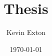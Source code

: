 \documentclass[11pt, a4paper, draft]{report}
\title{Thesis}
\author{Kevin Exton}
\date{\today}
\begin{document}
\maketitle
\renewcommand{\abstractname}{Executive Summary}
\begin{abstract}

\end{abstract}
\tableofcontents

\newpage


\end{document}
